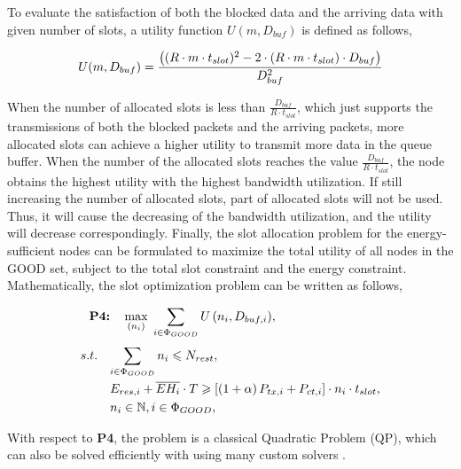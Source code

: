\documentclass[journal,10pt]{IEEEtran}
\begin{document}
To evaluate the satisfaction of both the blocked data and the arriving data with given number of slots, a utility function $U(m,D_{buf})$ is defined as follows,  

\begin{equation} \label{eq:utility}  \footnotesize
U(m,D_{buf}) = \frac{{\left( {{(R\cdot m \cdot t_{slot})^2} - 2 \cdot (R\cdot m \cdot t_{slot}) \cdot D_{buf}  } \right)}}{{D_{buf}^2}}
\end{equation}

When the number of allocated slots is less than $\frac{D_{buf}}{R \cdot t_{slot}}$, which just supports the transmissions of both the blocked packets and the arriving packets,  more allocated slots can achieve a higher utility to transmit more data in the queue buffer. When the number of the allocated slots reaches the value $\frac{D_{buf}}{R \cdot t_{slot}}$, the node obtains the highest utility with the highest bandwidth utilization. If still increasing the number of allocated slots, part of allocated slots will not be used. Thus, it will cause the decreasing of the bandwidth utilization, and the utility will decrease correspondingly.
Finally, the slot allocation problem for the energy-sufficient nodes can be formulated to maximize the total utility of all nodes in the GOOD set, subject to the total slot constraint and the energy constraint. Mathematically, the slot optimization problem can be written as follows,

\begin{subequations} \label{P4:slot_allocation} \small
\begin{align}
    \textbf{P4:}& \quad \mathop {\max }\limits_{\small{({{n_i}})}} \;  \sum\limits_{i \in {\Phi _{GOOD}}} {U\left( {{n_i} ,{D_{buf,i}}} \right)} , \label{P4:obj} \\
    s.t.\quad & {\sum\limits_{i \in {\Phi _{GOOD}}}^{} {{n_i} \leqslant {N_{rest}}}} , \label{P4:con1} \\
		& {{E_{res,i}} + \overline {E{H_i}}  \cdot T \geqslant \left[ {\left( {1 + \alpha } \right){P_{tx,i}} + {P_{ct,i}}} \right] \cdot {n_i} \cdot {t_{slot}}},\label{P4:con2}\\
    & {{n_i} \in {\Bbb N}}, i \in {\Phi _{GOOD}}, \label{P4:con3}
\end{align}
\end{subequations}

With respect to \textbf{P4}, the problem is a classical Quadratic Problem (QP), which can also be solved efficiently with using many custom solvers \cite{lofberg2004yalmip}.
\end{document}
